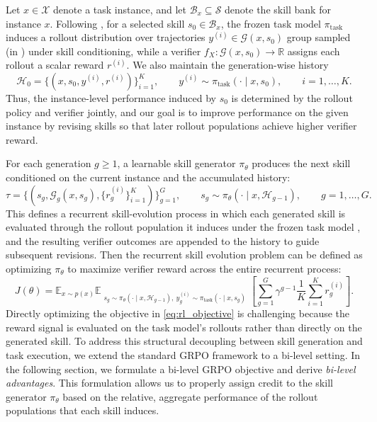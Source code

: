 Let $x \in \mathcal{X}$ denote a task instance, and let $\mathcal{B}_x \subseteq \mathcal{S}$ denote the skill bank for instance $x$. 
Following , for a selected skill $s_0 \in \mathcal{B}_{x}$, 
the frozen task model $\pi_{\mathrm{task}}$ induces a rollout distribution  over trajectories $y^{(i)} \in \mathcal{G}(x,s_0)$ group sampled (in ) under skill conditioning, 
while a verifier $f_X:\mathcal{G}(x,s_0)\to\mathbb{R}$ assigns each rollout a scalar reward $r^{(i)}$. 
We also maintain the generation-wise history
\begin{equation} \label{eq:history_init}
\mathcal{H}_0 = \{(x, s_0,y^{(i)},r^{(i)})\}_{i=1}^{K},
\qquad 
y^{(i)} \sim \pi_{\mathrm{task}}(\cdot \mid x, s_0), 
\qquad
i=1,\dots,K.
\end{equation}
Thus, the instance-level performance induced by $s_0$ is determined by the rollout policy and verifier jointly,
and our goal is to improve performance on the given instance by revising skills so that later rollout populations achieve higher verifier reward.

For each generation $g \ge 1$, a learnable skill generator $\pi_\theta$ produces the next skill conditioned on the current instance and the accumulated history:
\begin{equation} \label{eq:skill_gen}
\tau = \{(s_g,\mathcal{G}_g(x,s_g),\{r_g^{(i)}\}_{i=1}^{K})\}_{g=1}^{G},
\qquad
s_g \sim \pi_\theta(\cdot \mid x, \mathcal{H}_{g-1}),
\qquad g=1,\dots,G.
\end{equation}
This defines a recurrent skill-evolution process in which each generated skill is evaluated through the rollout population it induces under the frozen task model , 
and the resulting verifier outcomes are appended to the history to guide subsequent revisions. 
Then the recurrent skill evolution problem can be defined as optimizing $\pi_\theta$ to maximize verifier reward across the entire recurrent process:
\begin{equation} \label{eq:rl_objective}
J(\theta)
=
\mathbb{E}_{x \sim p(x)}
\mathbb{E}_{\substack{
s_g \sim \pi_\theta(\cdot \mid x, \mathcal{H}_{g-1}),\:
y_g^{(i)} \sim \pi_{\mathrm{task}}(\cdot \mid x, s_g)
}}
\left[
\sum_{g=1}^{G}
\gamma^{g-1}
\frac{1}{K}
\sum_{i=1}^{K} r_g^{(i)}
\right].
\end{equation}
Directly optimizing the objective in \eqref{eq:rl_objective} is challenging because the reward signal is evaluated on the task model's rollouts rather than directly on the generated skill. 
To address this structural decoupling between skill generation and task execution, we extend the standard GRPO framework to a bi-level setting. 
In the following section, we formulate a bi-level GRPO objective and derive \emph{bi-level advantages}. 
This formulation allows us to properly assign credit to the skill generator $\pi_\theta$ based on the relative, aggregate performance of the rollout populations that each skill induces.

